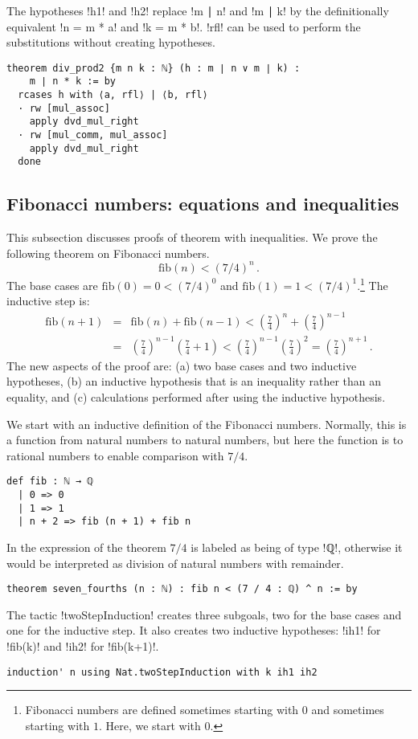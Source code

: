 The hypotheses !h1! and !h2! replace !m ∣ n! and !m ∣ k! by the definitionally equivalent !n = m * a! and !k = m * b!. !rfl! can be used to perform the substitutions without creating hypotheses.
\begin{Verbatim}
theorem div_prod2 {m n k : ℕ} (h : m ∣ n ∨ m ∣ k) :
    m ∣ n * k := by
  rcases h with ⟨a, rfl⟩ | ⟨b, rfl⟩
  · rw [mul_assoc]
    apply dvd_mul_right
  · rw [mul_comm, mul_assoc]
    apply dvd_mul_right
  done
\end{Verbatim}

\subsection{Fibonacci numbers: equations and inequalities}

This subsection discusses proofs of theorem with inequalities. We prove the following theorem on Fibonacci numbers.
\[
\textrm{fib}(n) < (7/4)^n\,.
\]
The base cases are $\textrm{fib}(0) = 0 < (7/4)^0$ and $\textrm{fib}(1) = 1 < (7/4)^1$.\footnote{Fibonacci numbers are defined sometimes starting with $0$ and sometimes starting with $1$. Here, we start with $0$.} The inductive step is:
\begin{eqnarray*}
\textrm{fib}(n+1)&=&\textrm{fib}(n)+\textrm{fib}(n-1)<\left(\frac{7}{4}\right)^n + \left(\frac{7}{4}\right)^{n-1}\\
&=&\left(\frac{7}{4}\right)^{n-1}\left(\frac{7}{4}+1\right)<\left(\frac{7}{4}\right)^{n-1}\left(\frac{7}{4}\right)^2=\left(\frac{7}{4}\right)^{n+1}\,.
\end{eqnarray*}
The new aspects of the proof are: (a) two base cases and two inductive hypotheses, (b) an inductive hypothesis that is an inequality rather than an equality, and (c) calculations performed after using the inductive hypothesis.

We start with an inductive definition of the Fibonacci numbers. Normally, this is a function from natural numbers to natural numbers, but here the function is to rational numbers to enable comparison with $7/4$.
\begin{Verbatim}
def fib : ℕ → ℚ
  | 0 => 0
  | 1 => 1
  | n + 2 => fib (n + 1) + fib n
\end{Verbatim}
In the expression of the theorem $7/4$ is labeled as being of type !ℚ!, otherwise it would be interpreted as division of natural numbers with remainder.
\begin{Verbatim}[firstnumber=last]
theorem seven_fourths (n : ℕ) : fib n < (7 / 4 : ℚ) ^ n := by
\end{Verbatim}
The tactic !twoStepInduction! creates three subgoals, two for the base cases and one for the inductive step. It also creates two inductive hypotheses: !ih1! for !fib(k)! and !ih2! for !fib(k+1)!.
\begin{Verbatim}[firstnumber=last]
  induction' n using Nat.twoStepInduction with k ih1 ih2
\end{Verbatim}


